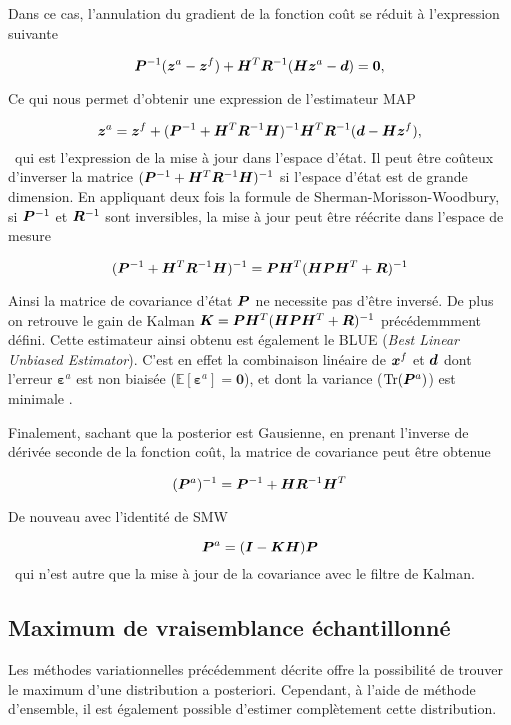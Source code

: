 Dans ce cas, l'annulation du gradient de la fonction coût se réduit à l'expression suivante

\begin{equation*}
    \bm{P}^{-1} (\bm z^a - \bm z^f) + \bm{H}^T \bm{R}^{-1}(\bm{H} \bm z^a - \bm d) = \bm 0,
\end{equation*}

Ce qui nous permet d'obtenir une expression de l'estimateur MAP

\begin{equation*}
    \bm z^a = \bm z^f + (\bm{P}^{-1} + \bm{H}^T \bm{R}^{-1} \bm{H})^{-1} \bm{H}^T \bm{R}^{-1} (\bm{d} - \bm{H} \bm z^f),
\end{equation*}~qui est l'expression de la mise à jour dans l'espace d'état. Il peut être coûteux d'inverser la matrice $(\bm{P}^{-1} + \bm{H}^T \bm{R}^{-1} \bm{H})^{-1}$ si l'espace d'état est de grande dimension. En appliquant deux fois la formule de Sherman-Morisson-Woodbury, si $\bm{P}^{-1}$ et $\bm{R}^{-1}$ sont inversibles, la mise à jour peut être réécrite dans l'espace de mesure

\begin{equation*}
    (\bm{P}^{-1} + \bm{H}^T \bm{R}^{-1} \bm{H})^{-1} = \bm{P} \bm{H}^T (\bm{H} \bm{P} \bm{H}^T + \bm{R})^{-1}
\end{equation*}

Ainsi la matrice de covariance d'état $\bm{P}$ ne necessite pas d'être inversé. De plus on retrouve le gain de Kalman $\bm{K} = \bm{P} \bm{H}^T (\bm{H} \bm{P} \bm{H}^T + \bm{R})^{-1}$ précédemmment défini. Cette estimateur ainsi obtenu est également le BLUE (\textit{Best Linear Unbiased Estimator}). C'est en effet la combinaison linéaire de $\bm{x}^f$ et $\bm{d}$ dont l'erreur $\bm \varepsilon^a$ est non biaisée ($\mathbb{E}[\bm \varepsilon^a] = \bm 0$), et dont la variance ($\operatorname{Tr}(\bm{P}^a)$) est minimale .

Finalement, sachant que la posterior est Gausienne, en prenant l'inverse de dérivée seconde de la fonction coût, la matrice de covariance peut être obtenue

\begin{equation*}
    (\bm{P}^a)^{-1} = \bm{P}^{-1} + \bm{H} \bm{R}^{-1} \bm{H}^T
\end{equation*}

De nouveau avec l'identité de SMW

\begin{equation*}
    \bm{P}^a = (\bm{I} - \bm{K} \bm{H}) \bm{P}
\end{equation*}~qui n'est autre que la mise à jour de la covariance avec le filtre de Kalman.

\subsection{Maximum de vraisemblance échantillonné}
Les méthodes variationnelles précédemment décrite offre la possibilité de trouver le maximum d'une distribution a posteriori. Cependant, à l'aide de méthode d'ensemble, il est également possible d'estimer complètement cette distribution.


